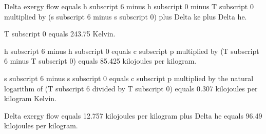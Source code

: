Delta exergy flow equals h subscript 6 minus h subscript 0 minus T subscript 0 multiplied by (s subscript 6 minus s subscript 0) plus Delta ke plus Delta he.  

T subscript 0 equals 243.75 Kelvin.  

h subscript 6 minus h subscript 0 equals c subscript p multiplied by (T subscript 6 minus T subscript 0) equals 85.425 kilojoules per kilogram.  

s subscript 6 minus s subscript 0 equals c subscript p multiplied by the natural logarithm of (T subscript 6 divided by T subscript 0) equals 0.307 kilojoules per kilogram Kelvin.  

Delta exergy flow equals 12.757 kilojoules per kilogram plus Delta he equals 96.49 kilojoules per kilogram.
